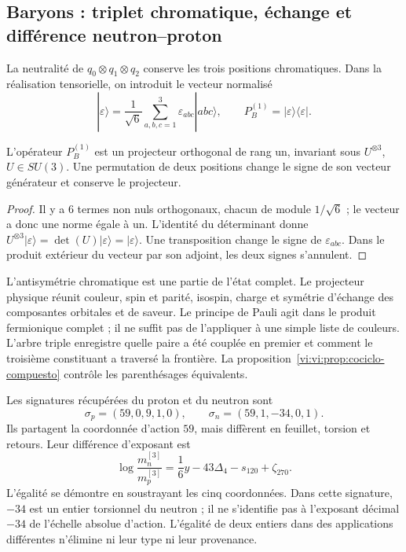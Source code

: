 \subsection{Baryons : triplet chromatique, échange et différence neutron--proton}
\label{vi:vi:subsec:bariones-familias}

La neutralité de \(q_0\otimes q_1\otimes q_2\) conserve les trois
positions chromatiques. Dans la réalisation tensorielle, on introduit le vecteur
normalisé
\[
 |\varepsilon\rangle=\frac1{\sqrt6}
 \sum_{a,b,c=1}^3\varepsilon_{abc}|abc\rangle,
 \qquad P_B^{(1)}=|\varepsilon\rangle\langle\varepsilon|.
\]

\begin{proposition}
\label{vi:vi:prop:singlete-barion}
L’opérateur \(P_B^{(1)}\) est un projecteur orthogonal de rang un,
invariant sous \(U^{\otimes3}\), \(U\in SU(3)\). Une permutation
de deux positions change le signe de son vecteur générateur et conserve
le projecteur.
\end{proposition}
\begin{proof}
Il y a \(6\) termes non nuls orthogonaux, chacun de module
\(1/\sqrt6\) ; le vecteur a donc une norme égale à un. L’identité
du déterminant donne
\(U^{\otimes3}|\varepsilon\rangle=
\det(U)|\varepsilon\rangle=|\varepsilon\rangle\).
Une transposition change le signe de \(\varepsilon_{abc}\). Dans le
produit extérieur du vecteur par son adjoint, les deux signes s’annulent.
\end{proof}

L’antisymétrie chromatique est une partie de l’état complet. Le projecteur
physique réunit couleur, spin et parité, isospin, charge et symétrie
d’échange des composantes orbitales et de saveur. Le principe de
Pauli agit dans le produit fermionique complet ; il ne suffit pas de l’appliquer à une
simple liste de couleurs. L’arbre triple enregistre quelle paire a été couplée
en premier et comment le troisième constituant a traversé la frontière. La
proposition~\ref{vi:vi:prop:cociclo-compuesto} contrôle les
parenthésages équivalents.

Les signatures récupérées du proton et du neutron sont
\[
 \sigma_p=(59,0,9,1,0),\qquad
 \sigma_n=(59,1,-34,0,1).
\]
Ils partagent la coordonnée d’action \(59\), mais diffèrent en feuillet,
torsion et retours. Leur différence d’exposant est
\begin{equation}
 \log\frac{m_n^{[3]}}{m_p^{[3]}}
 =\frac16y-43\Delta_4-s_{120}+\zeta_{270}.
 \label{vi:vi:eq:diferencia-neutron-proton}
\end{equation}
L’égalité se démontre en soustrayant les cinq coordonnées. Dans cette signature,
\(-34\) est un entier torsionnel du neutron ; il ne s’identifie pas à
l’exposant décimal \(-34\) de l’échelle absolue d’action. L’égalité
de deux entiers dans des applications différentes n’élimine ni leur type ni leur provenance.


